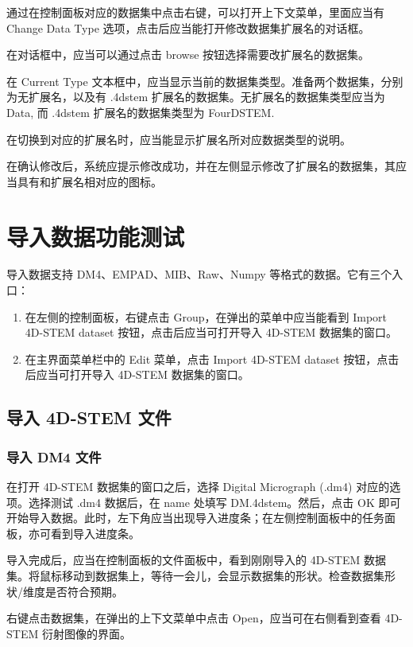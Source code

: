 \documentclass[a4paper,12pt]{report}	%
\begin{document}
通过在控制面板对应的数据集中点击右键，可以打开上下文菜单，里面应当有 Change Data Type 选项，点击后应当能打开修改数据集扩展名的对话框。

在对话框中，应当可以通过点击 browse 按钮选择需要改扩展名的数据集。

在 Current Type 文本框中，应当显示当前的数据集类型。准备两个数据集，分别为无扩展名，以及有 .4dstem 扩展名的数据集。无扩展名的数据集类型应当为 Data, 而 .4dstem 扩展名的数据集类型为 FourDSTEM. 

在切换到对应的扩展名时，应当能显示扩展名所对应数据类型的说明。

在确认修改后，系统应提示修改成功，并在左侧显示修改了扩展名的数据集，其应当具有和扩展名相对应的图标。


\chapter{导入数据功能测试}

导入数据支持 DM4、EMPAD、MIB、Raw、Numpy 等格式的数据。它有三个入口：
\begin{enumerate}
    \item 在左侧的控制面板，右键点击 Group，在弹出的菜单中应当能看到 Import 4D-STEM dataset 按钮，点击后应当可打开导入 4D-STEM 数据集的窗口。
    \item 在主界面菜单栏中的 Edit 菜单，点击 Import 4D-STEM dataset 按钮，点击后应当可打开导入 4D-STEM 数据集的窗口。
\end{enumerate}

\section{导入 4D-STEM 文件}

\subsection{导入 DM4 文件}

在打开 4D-STEM 数据集的窗口之后，选择 Digital Micrograph (.dm4) 对应的选项。选择测试 .dm4 数据后，在 name 处填写 DM.4dstem。然后，点击 OK 即可开始导入数据。此时，左下角应当出现导入进度条；在左侧控制面板中的任务面板，亦可看到导入进度条。

导入完成后，应当在控制面板的文件面板中，看到刚刚导入的 4D-STEM 数据集。将鼠标移动到数据集上，等待一会儿，会显示数据集的形状。检查数据集形状/维度是否符合预期。

右键点击数据集，在弹出的上下文菜单中点击 Open，应当可在右侧看到查看 4D-STEM 衍射图像的界面。
\end{document}
